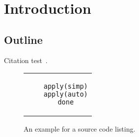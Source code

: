 
\chapter{Introduction}\label{chapter:introduction}

\section{Outline}
Citation test~\parencite{latex}.




\begin{figure}[htpb]
  \centering
  \begin{tabular}{c}
  \begin{lstlisting}
    apply(simp)
    apply(auto)
    done
  \end{lstlisting}
  \end{tabular}
  \caption[Example listing]{An example for a source code listing.}\label{fig:sample-listing}
\end{figure}
